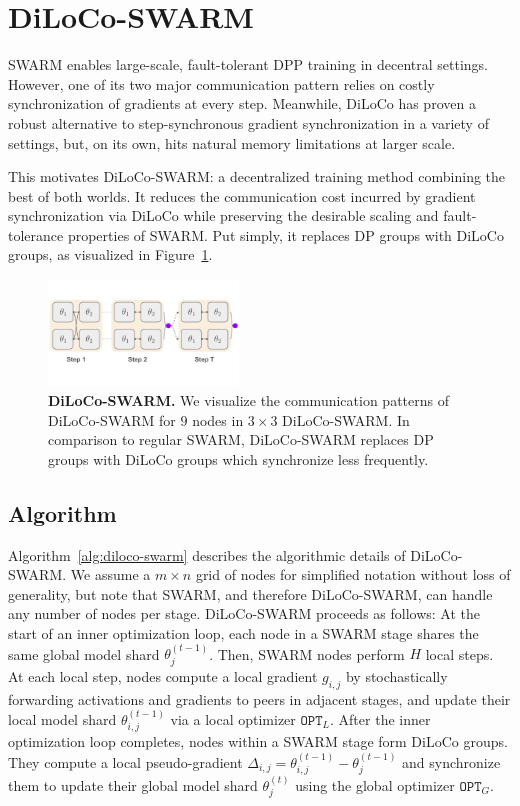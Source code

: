 \documentclass{article}
\begin{document}
\section{DiLoCo-SWARM}

SWARM enables large-scale, fault-tolerant DPP training in decentral settings.
However, one of its two major communication pattern relies on costly
synchronization of gradients at every step. Meanwhile, DiLoCo has proven a
robust alternative to step-synchronous gradient synchronization in a variety of
settings, but, on its own, hits natural memory limitations at larger scale.

This motivates DiLoCo-SWARM: a decentralized training method combining the best
of both worlds. It reduces the communication cost incurred by gradient
synchronization via DiLoCo while preserving the desirable scaling and
fault-tolerance properties of SWARM. Put simply, it replaces DP groups with
DiLoCo groups, as visualized in Figure~\ref{fig:diloco-swarm}.

\begin{figure}[ht]
    \centering
    \includegraphics[width=0.45\textwidth]{figures/diloco-swarm.pdf}
    \caption{\textbf{DiLoCo-SWARM.} We visualize the communication patterns of
    DiLoCo-SWARM for $9$ nodes in $3\times 3$ DiLoCo-SWARM. In comparison to
    regular SWARM, DiLoCo-SWARM replaces DP groups with DiLoCo groups which
    synchronize less frequently.}
    \label{fig:diloco-swarm}
\end{figure}

\subsection{Algorithm}

Algorithm~\ref{alg:diloco-swarm} describes the algorithmic details of
DiLoCo-SWARM. We assume a $m\times n$ grid of nodes for simplified notation
without loss of generality, but note that SWARM, and therefore DiLoCo-SWARM, can
handle any number of nodes per stage. DiLoCo-SWARM proceeds as follows: At the
start of an inner optimization loop, each node in a SWARM stage shares the same
global model shard $\theta_j^{(t-1)}$. Then, SWARM nodes perform $H$ local
steps. At each local step, nodes compute a local gradient $g_{i,j}$ by
stochastically forwarding activations and gradients to peers in adjacent stages,
and update their local model shard $\theta_{i,j}^{(t-1)}$ via a local optimizer
$\mathtt{OPT}_{L}$. After the inner optimization loop completes, nodes within a
SWARM stage form DiLoCo groups. They compute a local pseudo-gradient
$\Delta_{i,j} = \theta_{i,j}^{(t-1)} - \theta_j^{(t-1)}$ and synchronize them to
update their global model shard $\theta_j^{(t)}$ using the global optimizer
$\mathtt{OPT}_{G}$.
\end{document}
